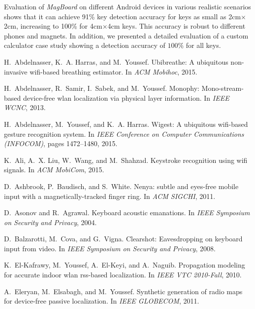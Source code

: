 \documentclass[conference]{IEEEtran}
\def \sys {\textit{MagBoard}}
\begin{document}
Evaluation of \sys{} on different Android devices in various realistic scenarios shows that it can achieve 91\% key detection accuracy for keys as small as 2cm$\times$2cm, increasing to 100\% for  4cm$\times$4cm keys.  This accuracy is robust to different phones and magnets. In addition, we presented a detailed evaluation of a custom calculator case study showing a detection accuracy of $100\%$ for all keys.


\begin{thebibliography}{10}

H.~Abdelnasser, K.~A. Harras, and M.~Youssef.
\newblock Ubibreathe: A ubiquitous non-invasive wifi-based breathing estimator.
\newblock In {\em ACM Mobihoc}, 2015.

H.~Abdelnasser, R.~Samir, I.~Sabek, and M.~Youssef.
\newblock Monophy: Mono-stream-based device-free wlan localization via physical
  layer information.
\newblock In {\em IEEE WCNC}, 2013.

H.~Abdelnasser, M.~Youssef, and K.~A. Harras.
\newblock Wigest: A ubiquitous wifi-based gesture recognition system.
\newblock In {\em IEEE Conference on Computer Communications (INFOCOM)}, pages
  1472--1480, 2015.

K.~Ali, A.~X. Liu, W.~Wang, and M.~Shahzad.
\newblock Keystroke recognition using wifi signals.
\newblock In {\em ACM MobiCom}, 2015.

D.~Ashbrook, P.~Baudisch, and S.~White.
\newblock Nenya: subtle and eyes-free mobile input with a magnetically-tracked
  finger ring.
\newblock In {\em ACM SIGCHI}, 2011.

D.~Asonov and R.~Agrawal.
\newblock Keyboard acoustic emanations.
\newblock In {\em IEEE Symposium on Security and Privacy}, 2004.

D.~Balzarotti, M.~Cova, and G.~Vigna.
\newblock Clearshot: Eavesdropping on keyboard input from video.
\newblock In {\em IEEE Symposium on Security and Privacy}, 2008.

K.~El-Kafrawy, M.~Youssef, A.~El-Keyi, and A.~Naguib.
\newblock Propagation modeling for accurate indoor wlan rss-based localization.
\newblock In {\em IEEE VTC 2010-Fall}, 2010.

A.~Eleryan, M.~Elsabagh, and M.~Youssef.
\newblock Synthetic generation of radio maps for device-free passive
  localization.
\newblock In {\em IEEE GLOBECOM}, 2011.


\end{thebibliography}
\end{document}
